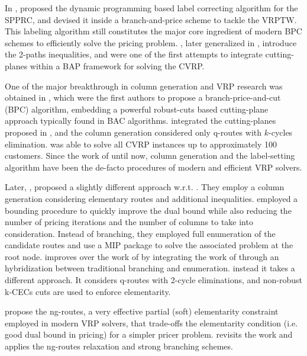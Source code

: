 In \citeyear{desrochers1992}, \citeauthor{desrochers1992}
proposed the dynamic programming based label correcting algorithm for the SPPRC,
and devised it inside a branch-and-price scheme to tackle the VRPTW.
This labeling algorithm still constitutes the major core ingredient
of modern BPC schemes to efficiently solve the pricing problem.
\textcite{kohl1999}, later generalized in \cite{desaulniers2008}, introduce the
2-paths inequalities, and were one of the first attempts to integrate
cutting-planes within a BAP framework for solving the CVRP.

One of the major breakthrough in column generation and VRP research
was obtained in \textcite{fukasawa2006}, which were the
first authors to propose a branch-price-and-cut (BPC) algorithm,
embedding a powerful robust-cuts based cutting-plane approach
typically found in BAC algorithms.
\citeauthor{fukasawa2006} integrated the cutting-planes proposed in \cite{lysgaard2004},
and the column generation considered only q-routes with $k$-cycles elimination.
\textcite{fukasawa2006} was able to solve all CVRP instances up to approximately 100 customers.
Since the work of \citeauthor{fukasawa2006} until now, column generation
and the label-setting algorithm have been the de-facto procedures
of modern and efficient VRP solvers.

Later, \textcite{baldacci2008}, proposed a slightly different approach w.r.t. \textcite{fukasawa2006}.
They employ a column generation considering elementary routes and additional inequalities.
\citeauthor{baldacci2008} employed a bounding procedure to quickly
improve the dual bound while also reducing the number
of pricing iterations and the number of columns to take into consideration.
Instead of branching, they employed full enumeration of the candidate
routes and use a MIP package to solve the associated problem at the root node.
\textcite{pessoa2008} improves over the work of \textcite{fukasawa2006}
by integrating the work of \textcite{baldacci2008}
through an hybridization between traditional branching and enumeration.
\textcite{contardo2011} instead it takes a different approach.
It considers q-routes with 2-cycle eliminations, and non-robust
k-CECs cuts are used to enforce elementarity.

\textcite{baldacci2011} propose the ng-routes, a very effective
partial (soft) elementarity constraint employed in modern VRP solvers,
that trade-offs the elementarity condition (i.e. good dual bound in pricing)
for a simpler pricer problem.
\textcite{ropke2012} revisits the work \citeauthor{fukasawa2006} and applies
the ng-routes relaxation and strong branching schemes.

